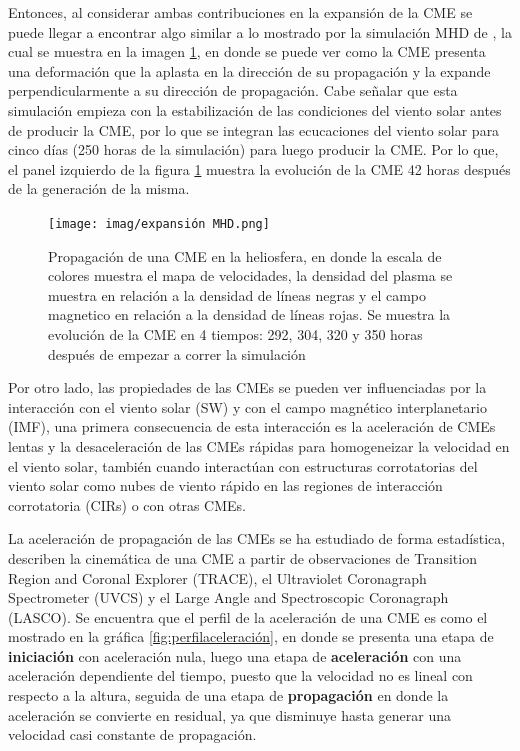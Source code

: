 Entonces, al considerar ambas contribuciones en la expansión de la \ac{CME} se puede llegar a encontrar algo similar a lo mostrado por la simulación MHD de \cite{odstrcil-2002}, la cual se muestra en la imagen \ref{fig:expansiónMHD}, en donde se puede ver como la \ac{CME} presenta una deformación que la aplasta en la dirección de su propagación y la expande perpendicularmente a su dirección de propagación. Cabe señalar que esta simulación empieza con la estabilización de las condiciones del viento solar antes de producir la CME, por lo que se integran las ecucaciones del viento solar para cinco días (250 horas de la simulación) para luego producir la CME. Por lo que, el panel izquierdo de la figura \ref{fig:expansiónMHD} muestra la evolución de la \ac{CME} 42 horas después de la generación de la misma.
\begin{figure}[H]
\centering
    \texttt{[image: imag/expansión MHD.png]}
    \caption[Resultados de velocidad, campo magnético y densidad del viento solar generados por la simulación hecha por \cite{odstrcil-2002}]{Propagación de una \ac{CME} en la heliosfera, en donde la escala de colores muestra el mapa de velocidades, la densidad del plasma se muestra en relación a la densidad de líneas negras y el campo magnetico en relación a la densidad de líneas rojas. Se muestra la evolución de la \ac{CME} en 4 tiempos: 292, 304, 320 y 350 horas después de empezar a correr la simulación}
    \label{fig:expansiónMHD}
\end{figure}

Por otro lado, las propiedades de las \acp{CME} se pueden ver influenciadas por la interacción con el viento solar (SW) y con el campo magnético interplanetario (IMF), una primera consecuencia de esta interacción es la aceleración de \acp{CME} lentas y la desaceleración de las \acp{CME} rápidas para homogeneizar la velocidad en el viento solar, también cuando interactúan con estructuras corrotatorias del viento solar como nubes de viento rápido en las regiones de interacción corrotatoria (CIRs) o con otras CMEs.

La aceleración de propagación de las \acp{CME} se ha estudiado de forma estadística, \cite[e.g.][]{gallagher-2003, zhang-2006} describen la cinemática de una \ac{CME} a partir de observaciones de Transition Region and Coronal Explorer (TRACE), el Ultraviolet Coronagraph Spectrometer (UVCS) y el Large Angle and Spectroscopic Coronagraph (LASCO). Se encuentra que el perfil de la aceleración de una \ac{CME} es como el mostrado en la gráfica \ref{fig:perfilaceleración}, en donde se presenta una etapa de \textbf{iniciación} con aceleración nula, luego una etapa de \textbf{aceleración} con una aceleración dependiente del tiempo, puesto que la velocidad no es lineal con respecto a la altura, seguida de una etapa de \textbf{propagación} en donde la aceleración se convierte en residual, ya que disminuye hasta generar una velocidad casi constante de propagación.

